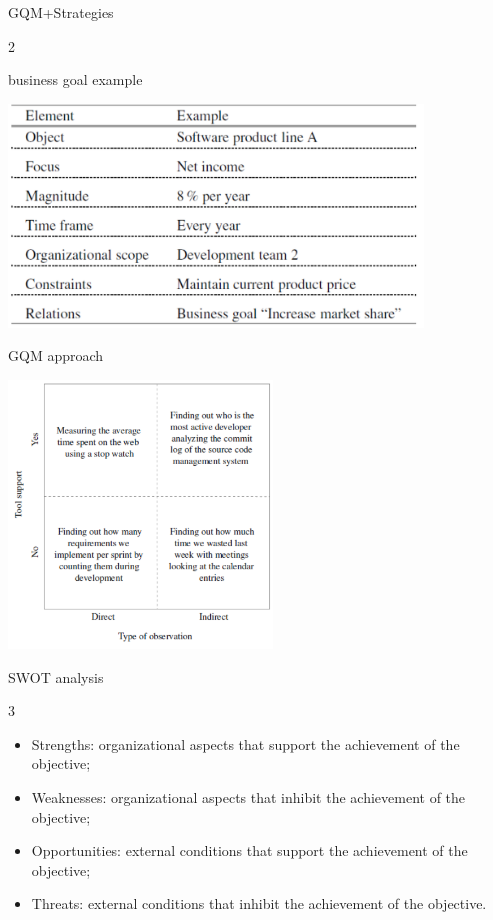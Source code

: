 \documentclass{beamer}
\begin{document}
\begin{frame}{\centerline{GQM+Strategies}}
2

\begin{center}
business goal example

\includegraphics[width=110mm]{A2022.IDSEPC.SperimentazioneDeduzione/image-06.png}
\end{center}

\end{frame}

\begin{frame}{\centerline{GQM approach}}


\begin{center}
\includegraphics[width=70mm]{A2022.IDSEPC.SperimentazioneDeduzione/image-01.png}
\end{center}
\end{frame}
\begin{frame}{\centerline{SWOT analysis}}
3

\begin{itemize}

\item  Strengths: organizational aspects that support the achievement of the objective;
\item  Weaknesses: organizational aspects that inhibit the achievement of the objective;
\item  Opportunities: external conditions that support the achievement of the objective;
\item  Threats: external conditions that inhibit the achievement of the objective.


\end{itemize}

\end{frame}
\end{document}
